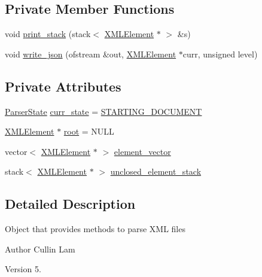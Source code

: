 \subsection*{Private Member Functions}
\begin{DoxyCompactItemize}
\item 
void \hyperlink{class_x_m_l_parser_a7c01eb1cb72c8e25a3b730c0a9c2cbba}{print\+\_\+stack} (stack$<$ \hyperlink{class_x_m_l_element}{X\+M\+L\+Element} $\ast$ $>$ \&s)
\item 
void \hyperlink{class_x_m_l_parser_ae586431c1d737fb3fba7494f35034d50}{write\+\_\+json} (ofstream \&out, \hyperlink{class_x_m_l_element}{X\+M\+L\+Element} $\ast$curr, unsigned level)
\end{DoxyCompactItemize}
\subsection*{Private Attributes}
\begin{DoxyCompactItemize}
\item 
\hyperlink{_x_m_l_parser_8h_acf067a9f09c2b2135f1a80d61e5eb253}{Parser\+State} \hyperlink{class_x_m_l_parser_a767386879606d4376d48f40d168df804}{curr\+\_\+state} = \hyperlink{_x_m_l_parser_8h_acf067a9f09c2b2135f1a80d61e5eb253a94619ef3a259944e2f7a7b02ffdca5bb}{S\+T\+A\+R\+T\+I\+N\+G\+\_\+\+D\+O\+C\+U\+M\+E\+N\+T}
\item 
\hyperlink{class_x_m_l_element}{X\+M\+L\+Element} $\ast$ \hyperlink{class_x_m_l_parser_a2754d1cccc12558fe54596c38509ca62}{root} = N\+U\+L\+L
\item 
vector$<$ \hyperlink{class_x_m_l_element}{X\+M\+L\+Element} $\ast$ $>$ \hyperlink{class_x_m_l_parser_aab04c279fc5c88412f481a96410386e1}{element\+\_\+vector}
\item 
stack$<$ \hyperlink{class_x_m_l_element}{X\+M\+L\+Element} $\ast$ $>$ \hyperlink{class_x_m_l_parser_a0a58d26870127737a3657b011a242fb4}{unclosed\+\_\+element\+\_\+stack}
\end{DoxyCompactItemize}


\subsection{Detailed Description}
Object that provides methods to parse X\+M\+L files \begin{DoxyAuthor}{Author}
Cullin Lam 
\end{DoxyAuthor}
\begin{DoxyVersion}{Version}
5. 
\end{DoxyVersion}


